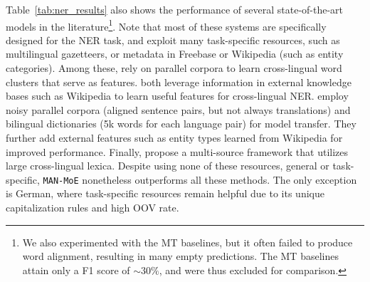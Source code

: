 \documentclass[11pt,a4paper]{article}
\newcommand{\manmoe}{\texttt{MAN-MoE}}
\begin{document}
Table~\ref{tab:ner_results} also shows the performance of several state-of-the-art models in the literature\footnote{We also experimented with the MT baselines, but it often failed to produce word alignment, resulting in many empty predictions. The MT baselines attain only a F1 score of ${\sim}30\%$, and were thus excluded for comparison.}.
Note that most of these systems are specifically designed for the NER task, and exploit many task-specific resources, such as multilingual gazetteers, or metadata in Freebase or Wikipedia (such as entity categories).
Among these, \citet{N12-1052} rely on parallel corpora to learn cross-lingual word clusters that serve as features.
\citet{Nothman:2013:LMN:2405838.2405915,K16-1022} both leverage information in external knowledge bases such as Wikipedia to learn useful features for cross-lingual NER.
\citet{P17-1135} employ noisy parallel corpora (aligned sentence pairs, but not always translations) and bilingual dictionaries (5k words for each language pair) for model transfer.
They further add external features such as entity types learned from Wikipedia for improved performance.
Finally, \citet{D17-1269} propose a multi-source framework that utilizes large cross-lingual lexica.
Despite using none of these resources, general or task-specific, \manmoe{} nonetheless outperforms all these methods.
The only exception is German, where task-specific resources remain helpful due to its unique capitalization rules and high OOV rate.
\end{document}
